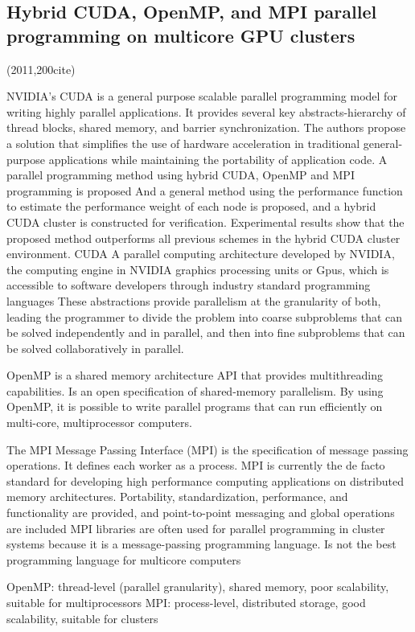 \documentclass[a4paper,twoside]{scrbook}
\begin{document}
\subsection{Hybrid CUDA, OpenMP, and MPI parallel programming on multicore GPU clusters \cite{yang2011hybrid}}
(2011,200cite)\par
NVIDIA's CUDA is a general purpose scalable parallel programming model for writing highly parallel applications. It provides several key abstracts-hierarchy of thread blocks, shared memory, and barrier synchronization.
The authors propose a solution that simplifies the use of hardware acceleration in traditional general-purpose applications while maintaining the portability of application code. A parallel programming method using hybrid CUDA, OpenMP and MPI programming is proposed
And a general method using the performance function to estimate the performance weight of each node is proposed, and a hybrid CUDA cluster is constructed for verification. Experimental results show that the proposed method outperforms all previous schemes in the hybrid CUDA cluster environment.
CUDA A parallel computing architecture developed by NVIDIA, the computing engine in NVIDIA graphics processing units or Gpus, which is accessible to software developers through industry standard programming languages
These abstractions provide parallelism at the granularity of both, leading the programmer to divide the problem into coarse subproblems that can be solved independently and in parallel, and then into fine subproblems that can be solved collaboratively in parallel.
\par
\par
OpenMP is a shared memory architecture API that provides multithreading capabilities. Is an open specification of shared-memory parallelism. By using OpenMP, it is possible to write parallel programs that can run efficiently on multi-core, multiprocessor computers.
\par
\par
The MPI Message Passing Interface (MPI) is the specification of message passing operations. It defines each worker as a process. MPI is currently the de facto standard for developing high performance computing applications on distributed memory architectures.
Portability, standardization, performance, and functionality are provided, and point-to-point messaging and global operations are included
MPI libraries are often used for parallel programming in cluster systems because it is a message-passing programming language. Is not the best programming language for multicore computers
\par
OpenMP: thread-level (parallel granularity), shared memory, poor scalability, suitable for multiprocessors
MPI: process-level, distributed storage, good scalability, suitable for clusters
\end{document}
